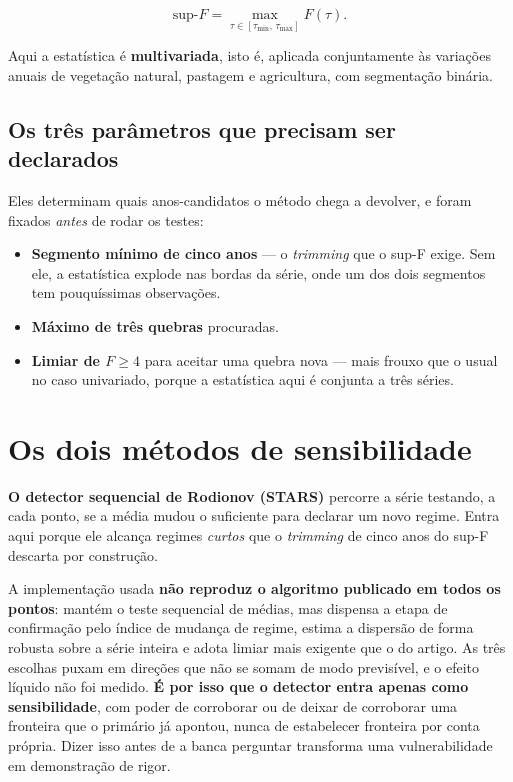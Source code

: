 \begin{equation}
\text{sup-}F = \max_{\tau \in [\tau_{\min},\, \tau_{\max}]} F(\tau).
\end{equation}

Aqui a estatística é \textbf{multivariada}, isto é, aplicada conjuntamente às
variações anuais de vegetação natural, pastagem e agricultura, com segmentação
binária.

\subsection{Os três parâmetros que precisam ser declarados}

Eles determinam quais anos-candidatos o método chega a devolver, e foram
fixados \emph{antes} de rodar os testes:

\begin{itemize}
\item \textbf{Segmento mínimo de cinco anos} --- o \emph{trimming} que o sup-F
exige. Sem ele, a estatística explode nas bordas da série, onde um dos dois
segmentos tem pouquíssimas observações.
\item \textbf{Máximo de três quebras} procuradas.
\item \textbf{Limiar de $F \geq 4$} para aceitar uma quebra nova --- mais
frouxo que o usual no caso univariado, porque a estatística aqui é conjunta a
três séries.
\end{itemize}

\section{Os dois métodos de sensibilidade}

\textbf{O detector sequencial de Rodionov (STARS)} percorre a série testando,
a cada ponto, se a média mudou o suficiente para declarar um novo regime.
Entra aqui porque ele alcança regimes \emph{curtos} que o \emph{trimming} de
cinco anos do sup-F descarta por construção.

\begin{armadilha}
A implementação usada \textbf{não reproduz o algoritmo publicado em todos os
pontos}: mantém o teste sequencial de médias, mas dispensa a etapa de
confirmação pelo índice de mudança de regime, estima a dispersão de forma
robusta sobre a série inteira e adota limiar mais exigente que o do artigo. As
três escolhas puxam em direções que não se somam de modo previsível, e o efeito
líquido não foi medido. \textbf{É por isso que o detector entra apenas como
sensibilidade}, com poder de corroborar ou de deixar de corroborar uma
fronteira que o primário já apontou, nunca de estabelecer fronteira por conta
própria. Dizer isso antes de a banca perguntar transforma uma vulnerabilidade
em demonstração de rigor.
\end{armadilha}


